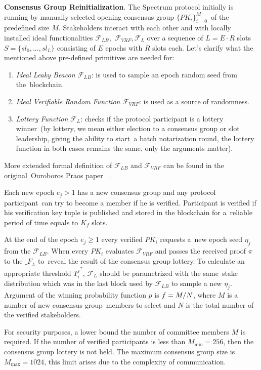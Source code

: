 \textbf{Consensus Group Reinitialization}.
The Spectrum protocol initially is running by manually selected opening consensus group $\{PK_i\}_{i=0}^M$\
of the predefined size $M$.
Stakeholders interact with each other and with locally installed ideal functionalities ${\mathcal{F}}_{LB}$,\
${\mathcal{F}}_{VRF}, {\mathcal{F}}_{L}$ over a sequence of $L = E \cdot R$ slots\
${S=\{sl_0,...,sl_L\}}$ consisting of $E$ epochs with $R$ slots each.
Let's clarify what the mentioned above pre-defined primitives are needed for:
\begin{enumerate}
    \item \emph{Ideal Leaky Beacon} ${\mathcal{F}}_{LB}$: is used to sample an epoch random seed from the\
    blockchain.
    \item \emph{Ideal Verifiable Random Function} ${\mathcal{F}}_{VRF}$: is used as a source of randomness.
    \item \emph{Lottery Function} ${\mathcal{F}}_{L}$: checks if the protocol participant is a lottery winner\
    (by lottery, we mean either election to a consensus group or slot leadership, giving the ability to start\
    a batch notarization round, the lottery function in both cases remains the same, only the arguments matter).
\end{enumerate}
More extended formal definition of ${\mathcal{F}}_{LB}$ and ${\mathcal{F}}_{VRF}$ can be found in the original\
Ouroboros Praos paper ~\cite{cryptoeprint:2017/573}.

Each new epoch ${e_j \gt 1}$ has a new consensus group and any protocol participant\
can try to become a member if he is verified.
Participant is verified if his verification key tuple is published and stored in the blockchain for a\
reliable period of time equals to $K_f$ slots.

At the end of the epoch ${e_j \geq 1}$ every verified $PK_i$ requests a\
new epoch seed $\eta_j$ from the ${\mathcal{F}}_{LB}$.
When every $PK_i$ evaluates ${\mathcal{F}}_{VRF}$ and passes the received proof $\pi$ to the ${\mathcal_{F}}_{L}$ to\
reveal the result of the consensus group lottery.
To calculate an appropriate threshold ${T_i^j}^*$, ${\mathcal{F}}_{L}$ should be parametrized with the same\
stake distribution which was in the last block used by ${\mathcal{F}}_{LB}$ to sample a new $\eta_j$.
Argument of the winning probability function $p$ is ${f = M /\/ N}$, where $M$ is a number of new consensus group\
members to select and $N$ is the total number of the verified stakeholders.

For security purposes, a lower bound the number of committee members $M$ is required.
If the number of verified participants is less than ${M_{\min}=256}$, then the consensus group lottery is not held.
The maximum consensus group size is ${M_{\max}=1024}$, this limit arises due to the complexity of communication.

